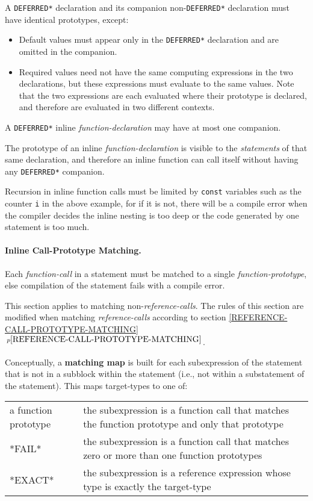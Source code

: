 \documentclass[12pt]{article}
\newcommand{\subsubsubsection}[1]{\paragraph[#1]{#1.}}
\newcommand{\key}[1]{{\rm \bfseries #1}}
\newcommand{\itemref}[1]{\ref{#1}$\,^{p\pageref{#1}}$}
\begin{document}
A {\tt *DEFERRED*} declaration and its companion non-{\tt *DEFERRED*}
declaration must have identical prototypes, except:
\label{COMPANION-DECLARATION}
\begin{itemize}
\item Default values must appear only in the {\tt *DEFERRED*} declaration
and are omitted in the companion.
\item Required values need not have the same computing expressions
in the two declarations, but these expressions must evaluate to the
same values.  Note that the two expressions are each evaluated where
their prototype is declared, and therefore are evaluated in
two different contexts.
\end{itemize}

A {\tt *DEFERRED*} inline {\em function-declaration} may have at
most one companion.

The prototype of an inline {\em function-declaration} is visible
to the {\em statements} of that same declaration, and therefore
an inline function can call itself without having any {\tt *DEFERRED*}
companion.

Recursion in inline function calls must be limited by {\tt const}
variables such as the counter {\tt i} in the above example,
for if it is not, there
will be a compile error when the compiler decides the inline nesting
is too deep or the code generated by one statement is too much.

\subsubsubsection{Inline Call-Prototype Matching}
\label{INLINE-CALL-PROTOTYPE-MATCHING}

Each {\em function-call} in a statement must be matched to a single
{\em function-prototype}, else compilation of the statement fails
with a compile error.

This section applies to matching non-{\em reference-calls}.  The
rules of this section are modified when matching {\em reference-calls}
according to section \itemref{REFERENCE-CALL-PROTOTYPE-MATCHING}.

Conceptually, a \key{matching map} is built for each subexpression
of the statement that is not in a subblock within the statement
(i.e., not within a substatement of the statement).
This maps target-types to one of:
\begin{center}
\begin{tabular}{lp{4.0in}}
a function prototype	& the subexpression is a function call that
			  matches the function prototype and only
			  that prototype
\\[1ex]
*FAIL*			& the subexpression is a function call that
                          matches zero or more than one function
			  prototypes
\\[1ex]
*EXACT*			& the subexpression is a reference expression
			  whose type is exactly the target-type

\end{tabular}
\end{center}
\end{document}
